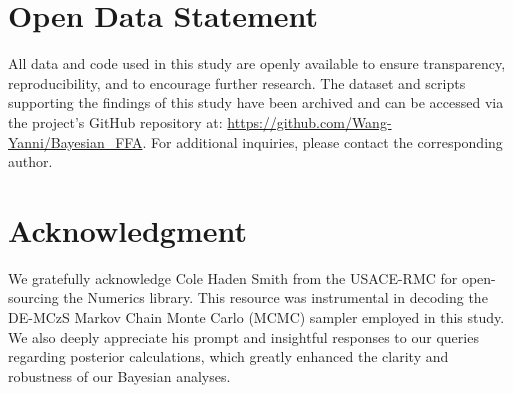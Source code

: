 \section*{Open Data Statement}
All data and code used in this study are openly available to ensure transparency, reproducibility, and to encourage further research. The dataset and scripts supporting the findings of this study have been archived and can be accessed via the project's GitHub repository at: \href{https://github.com/Wang-Yanni/Bayesian_FFA}{https://github.com/Wang-Yanni/Bayesian\_FFA}. For additional inquiries, please contact the corresponding author.


\section*{Acknowledgment}
We gratefully acknowledge Cole Haden Smith from the USACE-RMC for open-sourcing the Numerics library. This resource was instrumental in decoding the DE-MCzS Markov Chain Monte Carlo (MCMC) sampler employed in this study. We also deeply appreciate his prompt and insightful responses to our queries regarding posterior calculations, which greatly enhanced the clarity and robustness of our Bayesian analyses. 
